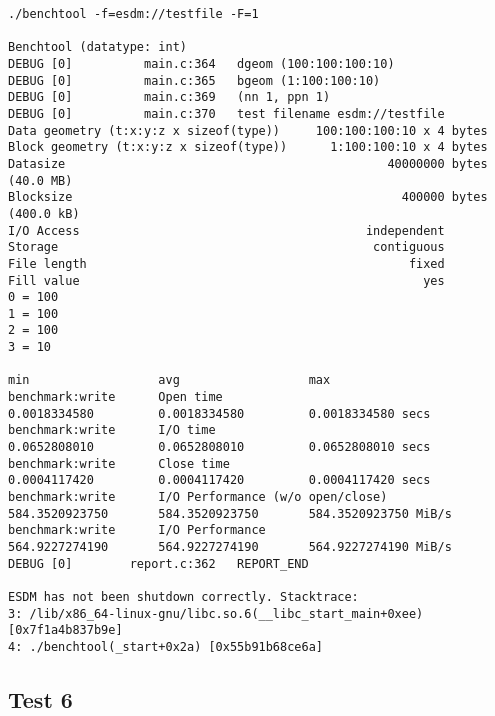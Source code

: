 \begin{verbatim}
./benchtool -f=esdm://testfile -F=1

Benchtool (datatype: int)
DEBUG [0]          main.c:364   dgeom (100:100:100:10)
DEBUG [0]          main.c:365   bgeom (1:100:100:10)
DEBUG [0]          main.c:369   (nn 1, ppn 1)
DEBUG [0]          main.c:370   test filename esdm://testfile
Data geometry (t:x:y:z x sizeof(type))     100:100:100:10 x 4 bytes
Block geometry (t:x:y:z x sizeof(type))      1:100:100:10 x 4 bytes
Datasize                                             40000000 bytes                (40.0 MB)
Blocksize                                              400000 bytes                (400.0 kB)
I/O Access                                        independent
Storage                                            contiguous
File length                                             fixed
Fill value                                                yes
0 = 100
1 = 100
2 = 100
3 = 10
                                                                               min                  avg                  max
benchmark:write      Open time                                        0.0018334580         0.0018334580         0.0018334580 secs
benchmark:write      I/O time                                         0.0652808010         0.0652808010         0.0652808010 secs
benchmark:write      Close time                                       0.0004117420         0.0004117420         0.0004117420 secs
benchmark:write      I/O Performance (w/o open/close)               584.3520923750       584.3520923750       584.3520923750 MiB/s
benchmark:write      I/O Performance                                564.9227274190       564.9227274190       564.9227274190 MiB/s
DEBUG [0]        report.c:362   REPORT_END

ESDM has not been shutdown correctly. Stacktrace:
3: /lib/x86_64-linux-gnu/libc.so.6(__libc_start_main+0xee) [0x7f1a4b837b9e]
4: ./benchtool(_start+0x2a) [0x55b91b68ce6a]
\end{verbatim}

\subsection{Test 6}

